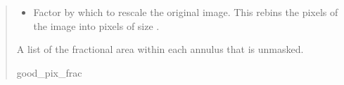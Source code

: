 \documentclass[letterpaper,12pt,english]{sphinxmanual}
\begin{document}
\begin{fulllineitems}
\begin{quote}
\begin{description}
\begin{itemize}
\item {} 
\sphinxAtStartPar
{} \textendash{} Factor by which to rescale the original image. This rebins the pixels of the image into pixels of size
.

\end{itemize}

\sphinxAtStartPar
A list of the fractional area within each annulus that is unmasked.

\sphinxAtStartPar
good\_pix\_frac

\end{description}\end{quote}

\end{fulllineitems}

\end{document}
